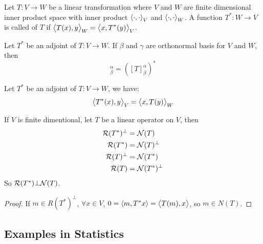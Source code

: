 \begin{definition}
    Let $T : V \rightarrow W$ be a linear transformation where $V$ and $W$ are finite dimensional inner product space with inner product $\left\langle \displaystyle \cdot{}, \cdot{} \right\rangle_V$ and $\left\langle \displaystyle \cdot{}, \cdot{} \right\rangle_W$. A function $T^* : W \rightarrow V$ is called  of $T$ if $\left\langle \displaystyle T(x), y \right\rangle_W = \left\langle \displaystyle x, T^*(y) \right\rangle_V$.
\end{definition}

\begin{theorem}
    Let $T^*$ be an adjoint of $T: V \rightarrow W$. If $\beta$ and $\gamma$ are orthonormal basis for $V$ and $W$, then
    \begin{equation}
        [T^*]_\beta^\alpha = \left([T]_\beta^\alpha\right)^*
    \end{equation}
\end{theorem}

\begin{theorem}
    Let $T^*$ be an adjoint of $T: V \rightarrow W$, we have:
    \begin{equation}
        \left\langle \displaystyle T^*(x), y \right\rangle_V = \left\langle \displaystyle x, T(y) \right\rangle_W
    \end{equation}
\end{theorem}



\begin{theorem}\label{nullandreciprocaladjoint}
    If $V$ is finite dimentional, let $T$ be a linear operator on $V$, then
    \begin{equation*}
        \begin{aligned}
            \mathcal{R}(T^*)^\bot &= \mathcal{N}(T)\\
            \mathcal{R}(T^*) &= \mathcal{N}(T)^\bot \\
            \mathcal{R}(T)^\bot &= \mathcal{N}(T^*)\\
            \mathcal{R}(T) &= \mathcal{N}(T^*)^\bot
        \end{aligned}
    \end{equation*}
    So $\mathcal{R}(T^*) \bot \mathcal{N}(T)$.
\end{theorem}
\begin{proof}
    If $m \in R(T^*)^\bot$, $\forall x \in V$, $0 = \left\langle \displaystyle m, T^*x \right\rangle = \left\langle \displaystyle T(m), x \right\rangle$, so $m \in N(T)$.
\end{proof}



\subsection{Examples in Statistics}\label{consistentandinconsistentequation}

